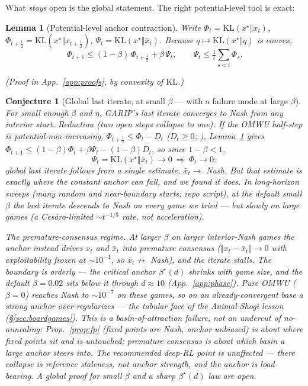 \documentclass[10pt,twocolumn]{article}
\theoremstyle{plain}
\newtheorem{lemma}{Lemma}
\newtheorem{conjecture}{Conjecture}
\theoremstyle{remark}
\newcommand{\KL}{\mathrm{KL}}
\begin{document}
\noindent What \emph{stays} open is the global statement. The right potential-level
tool is exact:

\begin{lemma}[Potential-level anchor contraction]
\label{lem:klconv}
Write $\Phi_t=\KL(x^\star\Vert x_t)$, $\Phi_{t+\frac12}=\KL(x^\star\Vert x_{t+\frac12})$,
$\Psi_t=\KL(x^\star\Vert\bar x_t)$. Because $q\mapsto\KL(x^\star\Vert q)$ is convex,
\[
\Phi_{t+1}\le(1-\beta)\,\Phi_{t+\frac12}+\beta\,\Psi_t,
\qquad \Psi_t\le\tfrac1t\textstyle\sum_{s<t}\Phi_s .
\]
\end{lemma}
\noindent\emph{(Proof in App.~\ref{app:proofs}, by convexity of $\KL$.)}

\begin{conjecture}[Global last iterate, at small $\beta$ --- with a failure mode at
large $\beta$]
\label{conj:li}
For \emph{small enough} $\beta$ and $\eta$, GARIP's last iterate converges to Nash from
any interior start. \emph{Reduction (two open steps collapse to one).} If the OMWU
half-step is potential-non-increasing, $\Phi_{t+\frac12}\le\Phi_t-D_t$ ($D_t\ge0$;
\cite{wei2021linear}), Lemma~\ref{lem:klconv} gives
$\Phi_{t+1}\le(1-\beta)\Phi_t+\beta\Psi_t-(1-\beta)D_t$, so since $1-\beta<1$,
\[
\Psi_t=\KL(x^\star\Vert\bar x_t)\to0\ \Longrightarrow\ \Phi_t\to0 :
\]
global last iterate follows from a \emph{single} estimate, $\bar x_t\to$ Nash.
\emph{But that estimate is exactly where the constant anchor can fail, and we found it
does.} In long-horizon sweeps (many random and near-boundary starts; repo script), at the
default small $\beta$ the last iterate descends to Nash on every game we tried --- but
slowly on large games (a Ces\`aro-limited $\sim t^{-1/3}$ rate, not acceleration).

\emph{The premature-consensus regime.} At larger $\beta$ on larger interior-Nash games
the anchor instead drives $x_t$ and $\bar x_t$ into \emph{premature consensus}
($\Vert x_t-\bar x_t\Vert\to0$ with exploitability frozen at $\sim10^{-1}$, so
$\bar x_t\not\to$ Nash), and the iterate stalls. The boundary is orderly --- the critical
anchor $\beta^\star(d)$ shrinks with game size, and the default $\beta\!=\!0.02$ sits
below it through $d\!\approx\!10$ (App.~\ref{app:phase}). Pure OMWU ($\beta\!=\!0$)
reaches Nash to $\sim10^{-7}$ on these games, so on an already-convergent base a strong
anchor over-regularizes --- the tabular face of the Animal-Shogi lesson
(\S\ref{sec:boardgames}). This is a \emph{basin-of-attraction} failure, not an undercut
of no-annealing: Prop.~\ref{prop:fp} (fixed points are Nash, anchor unbiased) is about
\emph{where} fixed points sit and is untouched; premature consensus is about \emph{which}
basin a large anchor steers into. The recommended \emph{deep-RL} point is unaffected ---
there collapse is reference \emph{staleness}, not anchor \emph{strength}, and the anchor
is load-bearing. A global proof for small $\beta$ and a sharp $\beta^\star(d)$ law are
open.
\end{conjecture}
\end{document}
